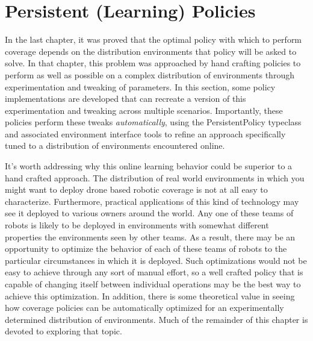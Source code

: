 
\section{Persistent (Learning) Policies}

In the last chapter, it was proved that the optimal policy with which to perform coverage depends on the distribution environments that policy will be asked to solve. In that chapter, this problem was approached by hand crafting policies to perform as well as possible on a complex distribution of environments through experimentation and tweaking of parameters. In this section, some policy implementations are developed that can recreate a version of this experimentation and tweaking across multiple scenarios. Importantly, these policies perform these tweaks \textit{automatically}, using the PersistentPolicy typeclass and associated environment interface tools to refine an approach specifically tuned to a distribution of environments encountered online.

It's worth addressing why this online learning behavior could be superior to a hand crafted approach. The distribution of real world environments in which you might want to deploy drone based robotic coverage is not at all easy to characterize. Furthermore, practical applications of this kind of  technology may see it deployed to various owners around the world. Any one of these teams of robots is likely to be deployed in environments with somewhat different properties the environments seen by other teams. As a result, there may be an opportunity to optimize the behavior of each of these teams of robots to the particular circumstances in which it is deployed. Such optimizations would not be easy to achieve through any sort of manual effort, so a well crafted policy that is capable of changing itself between individual operations may be the best way to achieve this optimization. In addition, there is some theoretical value in seeing how coverage policies can be automatically optimized for an experimentally determined distribution of environments. Much of the remainder of this chapter is devoted to exploring that topic.

